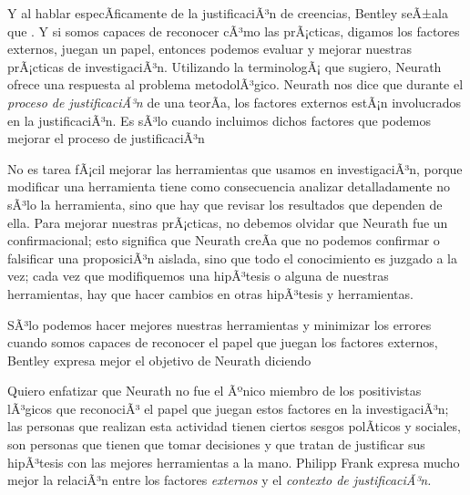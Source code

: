 Y al hablar especÃ­ficamente de la justificaciÃ³n de creencias, Bentley seÃ±ala que  \parencite[p.~41]{Bentley2023}.
Y si somos capaces de reconocer cÃ³mo las prÃ¡cticas, digamos los factores externos,  juegan un papel, entonces podemos evaluar y mejorar nuestras prÃ¡cticas de investigaciÃ³n.
Utilizando la terminologÃ¡ que sugiero, Neurath ofrece una respuesta al
problema metodolÃ³gico. Neurath nos dice que durante el \emph{proceso de
justificaciÃ³n} de una teorÃ­a, los factores externos estÃ¡n involucrados en
la justificaciÃ³n. Es sÃ³lo cuando incluimos dichos factores que podemos
mejorar el proceso de justificaciÃ³n

No es tarea fÃ¡cil mejorar las herramientas que usamos en investigaciÃ³n, porque modificar una herramienta tiene como consecuencia analizar detalladamente no sÃ³lo la herramienta, sino que hay que revisar los resultados que dependen de ella.
Para mejorar nuestras prÃ¡cticas, no debemos olvidar que Neurath fue un  confirmacional; esto significa que Neurath creÃ­a que no podemos confirmar o falsificar una proposiciÃ³n aislada, sino que todo el conocimiento es juzgado a la vez; 
cada vez que modifiquemos una hipÃ³tesis o alguna de nuestras herramientas, hay que hacer cambios en otras hipÃ³tesis y herramientas.

SÃ³lo podemos hacer mejores nuestras herramientas y minimizar los errores cuando somos capaces de reconocer el papel que juegan los factores externos, Bentley expresa mejor el objetivo de Neurath diciendo  \parencite[p.~41]{Bentley2023}

Quiero enfatizar que Neurath no fue el Ãºnico miembro de los positivistas lÃ³gicos que reconociÃ³ el papel que juegan estos factores en la investigaciÃ³n;
las personas que realizan esta actividad tienen ciertos sesgos polÃ­ticos y sociales, son personas que tienen que tomar decisiones y que tratan de justificar sus hipÃ³tesis con las mejores herramientas a la mano.
Philipp Frank expresa mucho mejor la relaciÃ³n entre los factores \emph{externos} y el \emph{contexto de justificaciÃ³n.}



